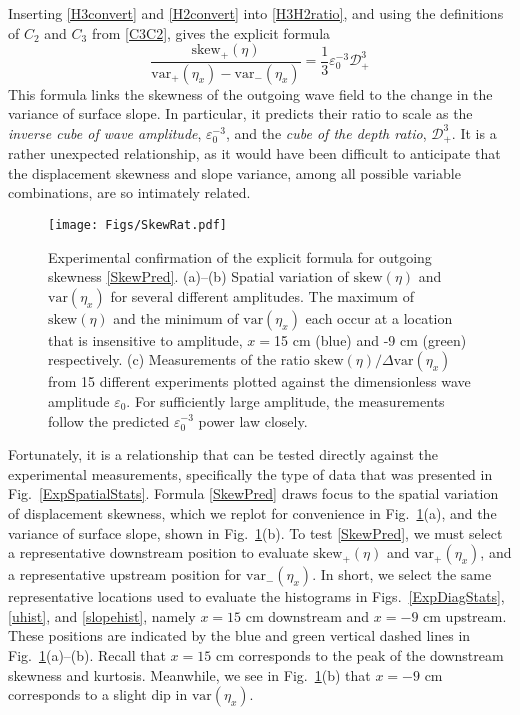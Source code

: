 \documentclass[11pt]{article}
\newcommand{\eps}{\varepsilon}
\newcommand{\etastd}{\eta_{\text std}}
\newcommand{\depth}{d}
\newcommand{\ddn}{\depth_{+}}
\newcommand{\drat}{\mathcal{D}}
\newcommand{\dratdn}{\drat_+}
\newcommand{\skw}{\text{skew}}
\newcommand{\skwdn}{\skw_+}
\newcommand{\var}{\text{var}}
\newcommand{\varup}{\var_-}
\newcommand{\vardn}{\var_+}
\newcommand{\epsup}{\eps_0}
\begin{document}
Inserting \eqref{H3convert} and \eqref{H2convert} into \eqref{H3H2ratio}, and using the definitions of $C_2$ and $C_3$ from \eqref{C3C2}, gives the explicit formula
\begin{equation}
\label{SkewPred}
\frac{\skwdn(\eta)} {\vardn(\eta_x) - \varup(\eta_x)} = \frac{1}{3} \epsup^{-3} \dratdn^3 
\end{equation}
This formula links the skewness of the outgoing wave field to the change in the variance of surface slope. In particular, it predicts their ratio to scale as the {\em inverse cube of wave amplitude}, $\epsup^{-3}$, and the {\em cube of the depth ratio}, $\dratdn^3$. It is a rather unexpected relationship, as it would have been difficult to anticipate that the displacement skewness and slope variance, among all possible variable combinations, are so intimately related.
 
\begin{figure}%
\begin{center}
\texttt{[image: Figs/SkewRat.pdf]}
\caption{
Experimental confirmation of the explicit formula for outgoing skewness \eqref{SkewPred}.
(a)--(b) Spatial variation of $\skw(\eta)$ and $\var(\eta_x)$ for several different amplitudes. The maximum of $\skw(\eta)$ and the minimum of $\var(\eta_x)$ each occur at a location that is insensitive to amplitude, $x = $15 cm (blue) and -9 cm (green) respectively.
(c) Measurements of the ratio $\skw(\eta) / \Delta \var(\eta_x)$ from 15 different experiments plotted against the dimensionless wave amplitude $\epsup$. For sufficiently large amplitude, the measurements follow the predicted $\epsup^{-3}$ power law closely.
}
\label{SkewRat}
\end{center}
\end{figure}
 
	Fortunately, it is a relationship that can be tested directly against the experimental measurements, specifically the type of data that was presented in Fig.~\ref{ExpSpatialStats}. Formula \eqref{SkewPred} draws focus to the spatial variation of displacement skewness, which we replot for convenience in Fig.~\ref{SkewRat}(a), and the variance of surface slope, shown in Fig.~\ref{SkewRat}(b). To test \eqref{SkewPred}, we must select a representative downstream position to evaluate $\skwdn(\eta)$ and $\vardn(\eta_x)$, and a representative upstream position for $\varup(\eta_x)$. In short, we select the same representative locations  used to evaluate the histograms in Figs.~\ref{ExpDiagStats}, \ref{uhist}, and \ref{slopehist}, namely $x = 15$ cm downstream and $x = -9$ cm upstream. These positions are indicated by the blue and green vertical dashed lines in Fig.~\ref{SkewRat}(a)--(b). Recall that $x = 15$ cm corresponds to the peak of the downstream skewness and kurtosis. Meanwhile, we see in Fig.~\ref{SkewRat}(b) that $x = -9$ cm corresponds to a slight dip in $\var(\eta_x)$.
\end{document}
